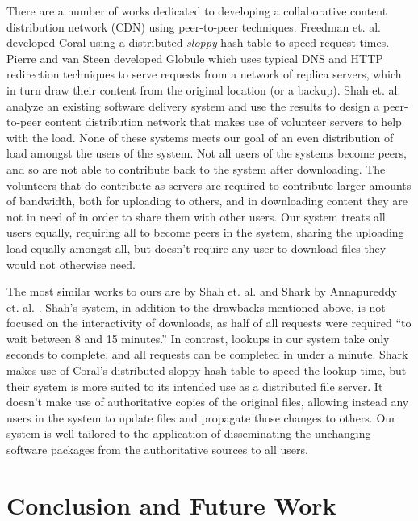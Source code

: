 \documentclass[conference]{IEEEtran}
\begin{document}
There are a number of works dedicated to developing a collaborative
content distribution network (CDN) using peer-to-peer techniques.
Freedman et. al. developed Coral \cite{coral} using a distributed
\emph{sloppy} hash table to speed request times. Pierre and van
Steen developed Globule \cite{globule} which uses typical DNS and
HTTP redirection techniques to serve requests from a network of
replica servers, which in turn draw their content from the original
location (or a backup). Shah et. al. \cite{shah08} analyze an
existing software delivery system and use the results to design a
peer-to-peer content distribution network that makes use of
volunteer servers to help with the load. None of these systems meets
our goal of an even distribution of load amongst the users of the
system. Not all users of the systems become peers, and so are not
able to contribute back to the system after downloading. The
volunteers that do contribute as servers are required to contribute
larger amounts of bandwidth, both for uploading to others, and in
downloading content they are not in need of in order to share them
with other users. Our system treats all users equally, requiring all
to become peers in the system, sharing the uploading load equally
amongst all, but doesn't require any user to download files they
would not otherwise need.

The most similar works to ours are by Shah et. al. \cite{shah08} and
Shark by Annapureddy et. al. \cite{shark}.
Shah's system, in addition to the drawbacks mentioned above,
is not focused on the interactivity of downloads, as
half of all requests were required ``to wait between 8 and 15
minutes.'' In contrast, lookups in our system take only seconds to
complete, and all requests can be completed in under a minute.
Shark makes use of Coral's distributed sloppy hash table to speed
the lookup time, but their system is more suited to its intended use
as a distributed file server. It doesn't make use of authoritative
copies of the original files, allowing instead any users in the
system to update files and propagate those changes to others. Our
system is well-tailored to the application of disseminating the
unchanging software packages from the authoritative sources to all
users.



\section{Conclusion and Future Work}
\label{conclusions}
\end{document}
